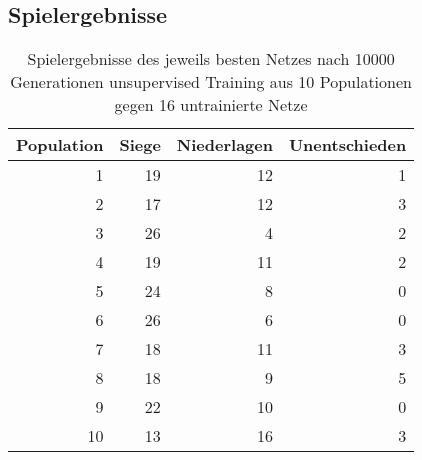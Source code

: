 \begin{appendices}
\section{Spielergebnisse}

\begin{table}[h]
    \centering
    \begin{tabular}[t]{|r|r|r|r|}
        \hline
        Population & Siege & Niederlagen & Unentschieden\\ \hline
         1 & 19 & 12 & 1 \\
         2 & 17 & 12 & 3 \\
         3 & 26 &  4 & 2 \\
         4 & 19 & 11 & 2 \\
         5 & 24 &  8 & 0 \\
         6 & 26 &  6 & 0 \\
         7 & 18 & 11 & 3 \\
         8 & 18 &  9 & 5 \\
         9 & 22 & 10 & 0 \\
        10 & 13 & 16 & 3 \\
        \hline
  \end{tabular}
  \caption[Spielergebnisse]{Spielergebnisse des jeweils besten Netzes nach
  \num{10000} Generationen unsupervised Training aus 10 Populationen gegen 16
  untrainierte Netze} \label{tab:gamedata}
\end{table}

\end{appendices}
